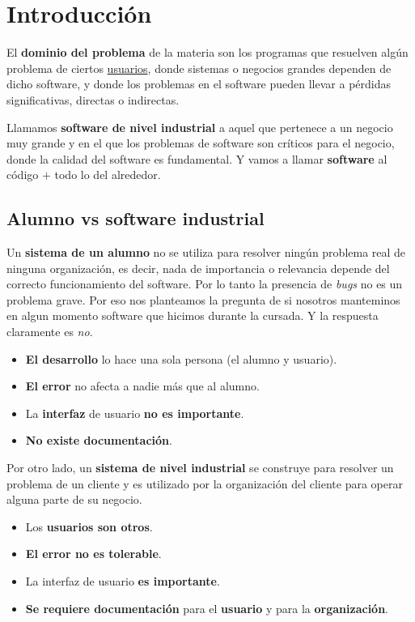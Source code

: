 
\section{Introducción}

El \textbf{dominio del problema} de la materia son los programas que resuelven algún problema de ciertos \underline{usuarios}, donde sistemas o negocios grandes dependen de dicho software, y donde los problemas en el software pueden llevar a pérdidas significativas, directas o indirectas.

\begin{mydef}{}{}
    Llamamos \textbf{software de nivel industrial} a aquel que pertenece a un negocio muy grande y en el que los problemas de software son críticos para el negocio, donde la calidad del software es fundamental. Y vamos a llamar \textbf{software} al código $+$ todo lo del alrededor.
\end{mydef}

\subsection{Alumno vs software industrial}

Un \textbf{sistema de un alumno} no se utiliza para resolver ningún problema real de ninguna organización, es decir, nada de importancia o relevancia depende del correcto funcionamiento del software. Por lo tanto la presencia de \textit{bugs} no es un problema grave. Por eso nos planteamos la pregunta de si nosotros manteminos en algun momento software que hicimos durante la cursada. Y la respuesta claramente es \textit{no}.

\begin{itemize}
    \item \textbf{El desarrollo} lo hace una sola persona (el alumno y usuario).
    \item \textbf{El error} no afecta a nadie más que al alumno.
    \item La \textbf{interfaz} de usuario \textbf{no es importante}.
    \item \textbf{No existe documentación}.
\end{itemize}

Por otro lado, un \textbf{sistema de nivel industrial} se construye para resolver un problema de un cliente y es utilizado por la organización del cliente para operar alguna parte de su negocio.

\begin{itemize}
    \item Los \textbf{usuarios son otros}.
    \item \textbf{El error no es tolerable}.
    \item La interfaz de usuario \textbf{es importante}.
    \item \textbf{Se requiere documentación} para el \textbf{usuario} y para la \textbf{organización}.
\end{itemize}

